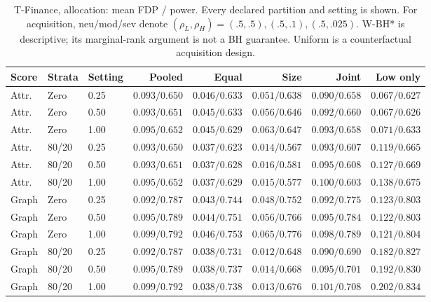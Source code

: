 \begin{table}[t]\centering\scriptsize\setlength{\tabcolsep}{3pt}
\caption{T-Finance, allocation: mean FDP / power. Every declared partition and setting is shown. For acquisition, neu/mod/sev denote $(\rho_L,\rho_H)=(.5,.5),(.5,.1),(.5,.025)$. W-BH* is descriptive; its marginal-rank argument is not a BH guarantee. Uniform is a counterfactual acquisition design.}
\begin{tabular}{lllrrrrr}\toprule Score & Strata & Setting & Pooled & Equal & Size & Joint & Low only\\\midrule
Attr. & Zero & 0.25 & $0.093/0.650$ & $0.046/0.633$ & $0.051/0.638$ & $0.090/0.658$ & $0.067/0.627$ \\
Attr. & Zero & 0.50 & $0.093/0.651$ & $0.045/0.633$ & $0.056/0.646$ & $0.092/0.660$ & $0.067/0.626$ \\
Attr. & Zero & 1.00 & $0.095/0.652$ & $0.045/0.629$ & $0.063/0.647$ & $0.093/0.658$ & $0.071/0.633$ \\
Attr. & 80/20 & 0.25 & $0.093/0.650$ & $0.037/0.623$ & $0.014/0.567$ & $0.093/0.607$ & $0.119/0.665$ \\
Attr. & 80/20 & 0.50 & $0.093/0.651$ & $0.037/0.628$ & $0.016/0.581$ & $0.095/0.608$ & $0.127/0.669$ \\
Attr. & 80/20 & 1.00 & $0.095/0.652$ & $0.037/0.629$ & $0.015/0.577$ & $0.100/0.603$ & $0.138/0.675$ \\
Graph & Zero & 0.25 & $0.092/0.787$ & $0.043/0.744$ & $0.048/0.752$ & $0.092/0.775$ & $0.123/0.803$ \\
Graph & Zero & 0.50 & $0.095/0.789$ & $0.044/0.751$ & $0.056/0.766$ & $0.095/0.784$ & $0.122/0.803$ \\
Graph & Zero & 1.00 & $0.099/0.792$ & $0.046/0.753$ & $0.065/0.776$ & $0.098/0.789$ & $0.121/0.804$ \\
Graph & 80/20 & 0.25 & $0.092/0.787$ & $0.038/0.731$ & $0.012/0.648$ & $0.090/0.690$ & $0.182/0.827$ \\
Graph & 80/20 & 0.50 & $0.095/0.789$ & $0.038/0.737$ & $0.014/0.668$ & $0.095/0.701$ & $0.192/0.830$ \\
Graph & 80/20 & 1.00 & $0.099/0.792$ & $0.038/0.738$ & $0.013/0.676$ & $0.101/0.708$ & $0.202/0.834$ \\
\bottomrule\end{tabular}\end{table}

